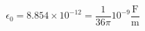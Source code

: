 \documentclass[fontsize=8pt]{scrartcl}
\begin{document}
  \begin{multicols}{3}
    \begin{equation}
      \tag{Permitividad del espacio libre}
      \epsilon_0 = 8.854 \times 10^{-12} = \frac{1}{36\pi}10^{-9} \frac{\text{F}}{\text{m}}
      \label{eqn:eps0}
    \end{equation}
  \end{multicols}
\end{document}
